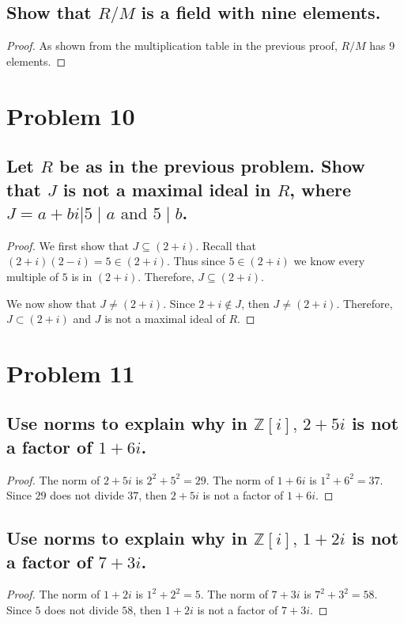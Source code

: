 \documentclass{article}
\theoremstyle{plain} %
\theoremstyle{definition} %
\begin{document}
\subsection*{Show that $R/M$ is a field with nine elements.}
\begin{proof}
    As shown from the multiplication table in the previous proof, $R/M$ has 9 elements.
\end{proof}

\section*{Problem 10}
\subsection*{Let $R$ be as in the previous problem. Show that $J$
is not a maximal ideal in $R$, where $J = {a+bi | 5\mid a \text{ and } 5\mid b}$.}
\begin{proof}
    We first show that $J \subseteq (2+i)$.
    Recall that $(2+i)(2-i) = 5 \in (2+i)$.
    Thus since $5 \in (2+i)$ we know every multiple of $5$ is in $(2+i)$.
    Therefore, $J \subseteq (2+i)$.

    We now show that $J \neq (2+i)$.
    Since $2+i \notin J$, then $J \neq (2+i)$.
    Therefore, $J \subset (2+i)$ and $J$ is not a maximal ideal of $R$.
\end{proof}

\section*{Problem 11}
\subsection*{Use norms to explain why in $\mathbb{Z}[i] \text{, } 2+5i$ is not a factor of
$1+6i$.}
\begin{proof}
    The norm of $2+5i$ is $2^2 + 5^2 = 29$. The norm of $1+6i$ is $1^2 + 6^2 = 37$.
    Since $29$ does not divide $37$, then $2+5i$ is not a factor of $1+6i$.
\end{proof}

\subsection*{Use norms to explain why in $\mathbb{Z}[i] \text{, } 1+2i$ is not a factor of
$7+3i$.}
\begin{proof}
    The norm of $1+2i$ is $1^2 + 2^2 = 5$. The norm of $7+3i$ is $7^2 + 3^2 = 58$.
    Since $5$ does not divide $58$, then $1+2i$ is not a factor of $7+3i$.
\end{proof}
\end{document}
